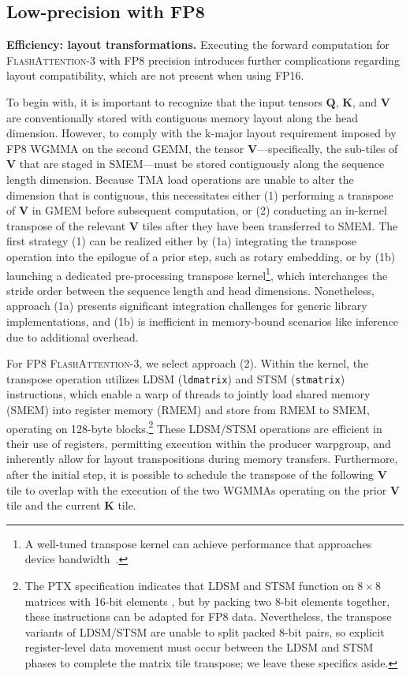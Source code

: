 \begin{algorithm}[H]
\begin{algorithmic}[1]
\subsection{Low-precision with FP8}
\label{sec:algofp8}

\textbf{Efficiency: layout transformations.} Executing the forward computation for \textsc{FlashAttention-3} with FP8 precision introduces further complications regarding layout compatibility, which are not present when using FP16.

To begin with, it is important to recognize that the input tensors $\mathbf{Q}$, $\mathbf{K}$, and $\mathbf{V}$ are conventionally stored with contiguous memory layout along the head dimension. However, to comply with the k-major layout requirement imposed by FP8 WGMMA on the second GEMM, the tensor $\mathbf{V}$—specifically, the sub-tiles of $\mathbf{V}$ that are staged in SMEM—must be stored contiguously along the sequence length dimension. Because TMA load operations are unable to alter the dimension that is contiguous, this necessitates either (1) performing a transpose of $\mathbf{V}$ in GMEM before subsequent computation, or (2) conducting an in-kernel transpose of the relevant $\mathbf{V}$ tiles after they have been transferred to SMEM. The first strategy (1) can be realized either by (1a) integrating the transpose operation into the epilogue of a prior step, such as rotary embedding, or by (1b) launching a dedicated pre-processing transpose kernel\footnote{A well-tuned transpose kernel can achieve performance that approaches device bandwidth~\citep{colfax_cutlass_transpose_2024}.}, which interchanges the stride order between the sequence length and head dimensions. Nonetheless, approach (1a) presents significant integration challenges for generic library implementations, and (1b) is inefficient in memory-bound scenarios like inference due to additional overhead.

For FP8 \textsc{FlashAttention-3}, we select approach (2). Within the kernel, the transpose operation utilizes LDSM (\verb|ldmatrix|) and STSM (\verb|stmatrix|) instructions, which enable a warp of threads to jointly load shared memory (SMEM) into register memory (RMEM) and store from RMEM to SMEM, operating on 128-byte blocks.\footnote{The PTX specification indicates that LDSM and STSM function on $8 \times 8$ matrices with 16-bit elements \cite[\S 9.7.13.4.15-16]{ptx}, but by packing two 8-bit elements together, these instructions can be adapted for FP8 data. Nevertheless, the transpose variants of LDSM/STSM are unable to split packed 8-bit pairs, so explicit register-level data movement must occur between the LDSM and STSM phases to complete the matrix tile transpose; we leave these specifics aside.} These LDSM/STSM operations are efficient in their use of registers, permitting execution within the producer warpgroup, and inherently allow for layout transpositions during memory transfers. Furthermore, after the initial step, it is possible to schedule the transpose of the following $\mathbf{V}$ tile to overlap with the execution of the two WGMMAs operating on the prior $\mathbf{V}$ tile and the current $\mathbf{K}$ tile.


\end{algorithmic}
\end{algorithm}
